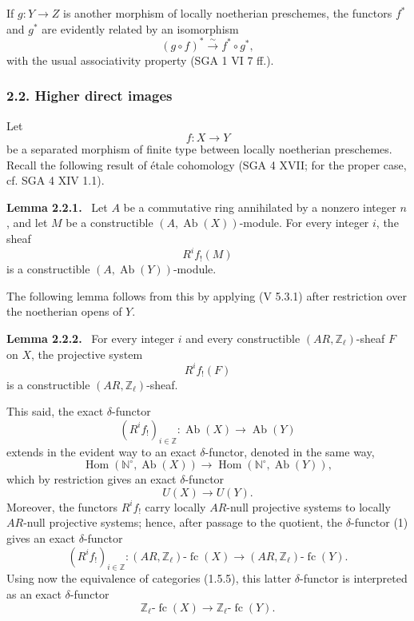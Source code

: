 \documentclass[11pt]{article}
\newenvironment{statement}[1]{\par\medskip\noindent\textbf{#1.}\ }{\par\medskip}
\DeclareMathOperator{\Hom}{Hom}
\providecommand{\Hom}{\operatorname{Hom}}
\providecommand{\Ab}{\operatorname{Ab}}
\providecommand{\fc}{\operatorname{fc}}
\begin{document}
If \(g:Y\to Z\) is another morphism of locally noetherian preschemes, the functors \(f^*\) and \(g^*\) are evidently related by an isomorphism
\[
(g\circ f)^*\xrightarrow{\sim}f^*\circ g^*,
\]
with the usual associativity property (SGA 1 VI 7 ff.).

\subsubsection*{2.2. Higher direct images}

Let
\[
f:X\longrightarrow Y
\]
be a separated morphism of finite type between locally noetherian preschemes. Recall the following result of étale cohomology (SGA 4 XVII; for the proper case, cf. SGA 4 XIV 1.1).

\begin{statement}{Lemma 2.2.1}
Let \(A\) be a commutative ring annihilated by a nonzero integer \(n\), and let \(M\) be a constructible \((A,\Ab(X))\)-module. For every integer \(i\), the sheaf
\[
R^if_!(M)
\]
is a constructible \((A,\Ab(Y))\)-module.
\end{statement}

The following lemma follows from this by applying (V 5.3.1) after restriction over the noetherian opens of \(Y\).

\begin{statement}{Lemma 2.2.2}
For every integer \(i\) and every constructible \((AR,\mathbb Z_\ell)\)-sheaf \(F\) on \(X\), the projective system
\[
R^if_!(F)
\]
is a constructible \((AR,\mathbb Z_\ell)\)-sheaf.
\end{statement}

This said, the exact \(\delta\)-functor
\[
(R^if_!)_{i\in\mathbb Z}:\Ab(X)\longrightarrow \Ab(Y)
\]
extends in the evident way to an exact \(\delta\)-functor, denoted in the same way,
\[
\Hom(\mathbb N^\circ,\Ab(X))\longrightarrow \Hom(\mathbb N^\circ,\Ab(Y)),
\]
which by restriction gives an exact \(\delta\)-functor
\[
U(X)\longrightarrow U(Y).
\tag{1}
\]
Moreover, the functors \(R^if_!\) carry locally \(AR\)-null projective systems to locally \(AR\)-null projective systems; hence, after passage to the quotient, the \(\delta\)-functor (1) gives an exact \(\delta\)-functor
\[
(R^if_!)_{i\in\mathbb Z}:(AR,\mathbb Z_\ell)\text{-}\fc(X)
\longrightarrow (AR,\mathbb Z_\ell)\text{-}\fc(Y).
\]
Using now the equivalence of categories (1.5.5), this latter \(\delta\)-functor is interpreted as an exact \(\delta\)-functor
\[
\mathbb Z_\ell\text{-}\fc(X)\longrightarrow \mathbb Z_\ell\text{-}\fc(Y).
\]
\end{document}
